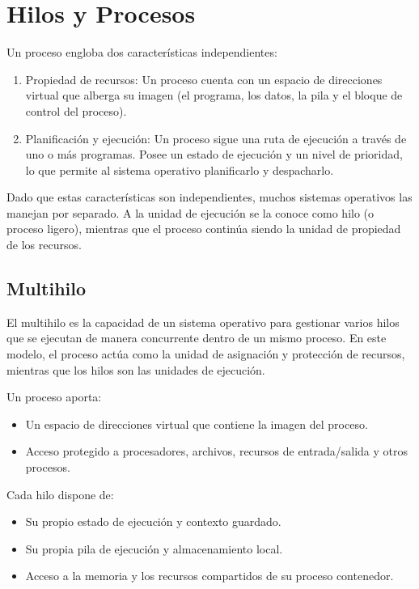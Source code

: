 \section{Hilos y Procesos}

Un proceso engloba dos características independientes:
\begin{enumerate}
  \item Propiedad de recursos: Un proceso cuenta con un espacio de direcciones virtual que alberga su imagen (el programa, los datos, la pila y el bloque de control del proceso).
  \item Planificación y ejecución: Un proceso sigue una ruta de ejecución a través de uno o más programas. Posee un estado de ejecución y un nivel de prioridad, lo que permite al sistema operativo planificarlo y despacharlo.
\end{enumerate}

Dado que estas características son independientes, muchos sistemas operativos las manejan por separado. A la unidad de ejecución se la conoce como hilo (o proceso ligero), mientras que el proceso continúa siendo la unidad de propiedad de los recursos.

\subsection{Multihilo}

El multihilo es la capacidad de un sistema operativo para gestionar varios hilos que se ejecutan de manera concurrente dentro de un mismo proceso. En este modelo, el proceso actúa como la unidad de asignación y protección de recursos, mientras que los hilos son las unidades de ejecución.

Un proceso aporta:
\begin{itemize}
  \item Un espacio de direcciones virtual que contiene la imagen del proceso.
  \item Acceso protegido a procesadores, archivos, recursos de entrada/salida y otros procesos.
\end{itemize}
Cada hilo dispone de:
\begin{itemize}
  \item Su propio estado de ejecución y contexto guardado.
  \item Su propia pila de ejecución y almacenamiento local.
  \item Acceso a la memoria y los recursos compartidos de su proceso contenedor.
\end{itemize}

